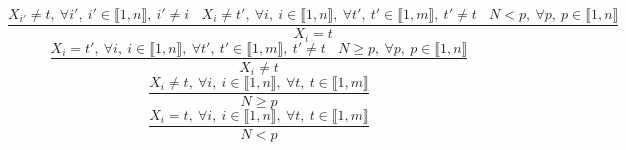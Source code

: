 $$\frac{X_{i'} \neq t,~\forall i',~i' \in \llbracket1,n\rrbracket,~i' \neq i~~~~X_{i} \neq t',~\forall i,~i \in \llbracket1,n\rrbracket,~\forall t',~t' \in \llbracket1,m\rrbracket,~t' \neq t~~~~N<p,~\forall p,~p \in \llbracket1,n\rrbracket}{X_{i}=t}$$ $$\frac{X_{i}=t',~\forall i,~i \in \llbracket1,n\rrbracket,~\forall t',~t' \in \llbracket1,m\rrbracket,~t' \neq t~~~~N \geq p,~\forall p,~p \in \llbracket1,n\rrbracket}{X_{i} \neq t}$$ $$\frac{X_{i} \neq t,~\forall i,~i \in \llbracket1,n\rrbracket,~\forall t,~t \in \llbracket1,m\rrbracket}{N \geq p}$$ $$\frac{X_{i}=t,~\forall i,~i \in \llbracket1,n\rrbracket,~\forall t,~t \in \llbracket1,m\rrbracket}{N<p}$$ 